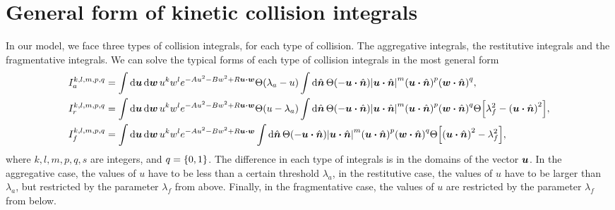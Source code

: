\documentclass[aps,prl,preprint,groupedaddress,10pt]{revtex4-2}
\begin{document}
\section{General form of kinetic collision integrals}
In our model, we face three types of collision integrals, for each type of collision.
The aggregative integrals, the restitutive integrals and the fragmentative integrals.
We can solve the typical forms of each type of collision integrals in the most general form
\begin{equation}
    \begin{split}
        I_a^{k,l,m,p,q} = \int\dd{\bu}\dd{\bw}u^kw^l& e^{-Au^2-Bw^2+R\bu\vdot\bw}
        \Theta\pqty{\lambda_a-u}
        \int\dd{\bn}\Theta\pqty{-\bu\vdot\bn}\abs{\bu\vdot\bn}^m\pqty{\bu\vdot\bn}^p
        \pqty{\bw\vdot\bn}^q,\\
        I_r^{k,l,m,p,q} = \int\dd{\bu}\dd{\bw}u^kw^l& e^{-Au^2-Bw^2+R\bu\vdot\bw}
        \Theta\pqty{u-\lambda_a}
        \int\dd{\bn}\Theta\pqty{-\bu\vdot\bn}\abs{\bu\vdot\bn}^m\pqty{\bu\vdot\bn}^p
        \pqty{\bw\vdot\bn}^q\Theta\bqty{\lambda_f^2-\pqty{\bu\vdot\bn}^2},\\
        I_f^{k,l,m,p,q} = \int\dd{\bu}\dd{\bw}u^kw^l& e^{-Au^2-Bw^2+R\bu\vdot\bw}
        \int\dd{\bn}\Theta\pqty{-\bu\vdot\bn}\abs{\bu\vdot\bn}^m\pqty{\bu\vdot\bn}^p
        \pqty{\bw\vdot\bn}^q\Theta\bqty{\pqty{\bu\vdot\bn}^2-\lambda_f^2},
    \end{split}
\end{equation}
where $k,l,m,p,q,s$ are integers, and $q=\Bqty{0,1}$. The difference in each type of
integrals is in the domains of the vector $\vb*{u}$. In the aggregative case, the values of
$u$ have to be less than a certain threshold $\lambda_a$, in the restitutive case, the
values of $u$ have to be larger than $\lambda_a$, but restricted by the parameter
$\lambda_f$ from above. Finally, in the fragmentative case, the values of $u$ are restricted
by the parameter $\lambda_f$ from below.
\end{document}
